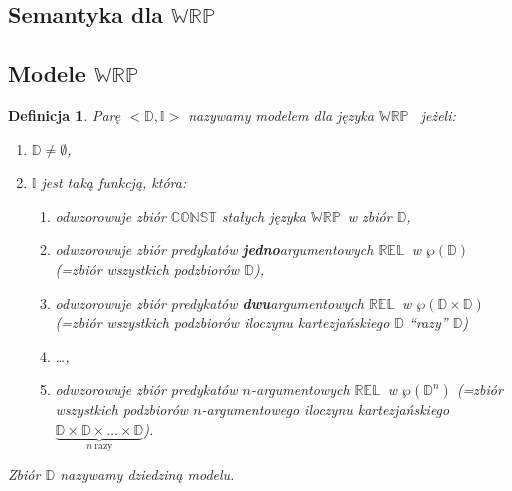 \documentclass[12pt]{article}
\newtheorem{definicja}{Definicja}
\newcommand {\WRP} {\ensuremath{\mathbb{WRP}}}
\newcommand {\Rel} {\ensuremath{\mathbb{REL}}}
\begin{document}
\subsection{Semantyka dla \WRP}


\subsection{Modele \WRP}
%
\begin{definicja}
Parę $<\mathbb{D}, \mathbb{I}>$ nazywamy modelem dla języka \WRP~ jeżeli:
%
\begin{enumerate}
\item $\mathbb{D} \neq \emptyset$,
%
\item $\mathbb{I}$ jest taką funkcją, która:
%
\begin{enumerate}
\item odwzorowuje zbiór $\mathbb{CONST}$ stałych języka \WRP\   w zbiór $\mathbb{D}$,
%
\item odwzorowuje zbiór predykatów \textbf{jedno}argumentowych \Rel\  w $\wp(\mathbb{D})$ (=zbiór wszystkich podzbiorów $\mathbb{D}$),
%
\item odwzorowuje zbiór predykatów \textbf{dwu}argumentowych \Rel\  w $\wp(\mathbb{D} \times \mathbb{D})$ (=zbiór wszystkich podzbiorów iloczynu kartezjańskiego $\mathbb{D}$ ``razy'' $\mathbb{D}$)
\item \dots,
%
\item odwzorowuje zbiór predykatów $n$-argumentowych \Rel\  w $\wp(\mathbb{D}^{n})$ (=zbiór wszystkich podzbiorów $n$-argumentowego iloczynu kartezjańskiego $\underbrace {\mathbb{D} \times \mathbb{D} \times \dots \times \mathbb{D}}_{n \mathrm{~razy}}$).
\end{enumerate}
\end{enumerate}
%
Zbiór $\mathbb{D}$ nazywamy dziedziną modelu. %
\end{definicja}
%
\end{document}
